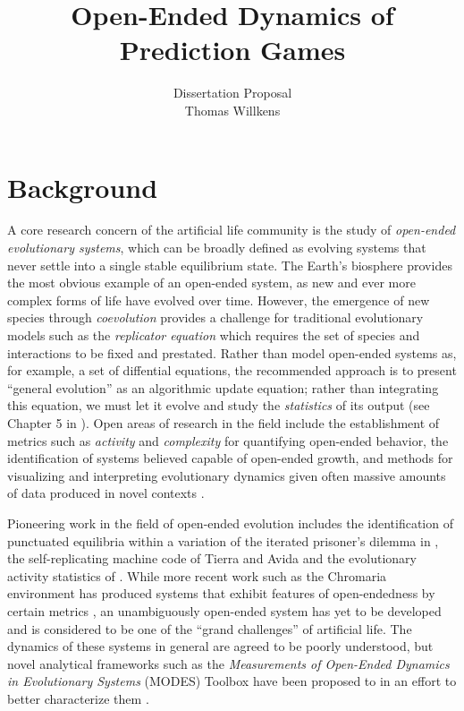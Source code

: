 \documentclass{article}
\title{Open-Ended Dynamics of Prediction Games}
\author{Dissertation Proposal\\
    Thomas Willkens
    }
\date{}
\begin{document}
\maketitle

\section*{Background}
A core research concern of the artificial life community is the study of
\textit{open-ended evolutionary systems}, which can be broadly defined as evolving systems that
never settle into a single stable equilibrium state. The Earth's biosphere provides the most
obvious example of an open-ended system, as new and ever more complex forms of life have evolved over 
time. However, the emergence of new species through \textit{coevolution} 
provides a challenge for traditional evolutionary models
such as the \textit{replicator equation} which requires the set of species and interactions to be 
fixed and prestated. Rather than model open-ended systems as, for example, a set of diffential equations, 
the recommended approach is to present ``general evolution'' as an algorithmic update equation;
rather than integrating this equation, we must let it evolve and study the \textit{statistics}
of its output (see Chapter 5 in \citep{thurner2018}). 
Open areas of research in the field include the establishment of metrics such as 
\textit{activity} and \textit{complexity} for quantifying open-ended behavior, the 
identification of systems believed capable of open-ended growth, and methods for visualizing 
and interpreting evolutionary dynamics given often massive amounts of data produced in novel 
contexts \citep{packard2019,stepney2021modelling,dolson2020}.

Pioneering work in the field of open-ended evolution includes the identification of punctuated 
equilibria within a variation of the
iterated prisoner's dilemma in \citet{lindgren1994evolutionary}, the self-replicating machine 
code of Tierra and Avida \citep{ray1992evolution,ofria2004avida} and the evolutionary activity 
statistics of \citet{Channon2001PassingTA}. While more recent work such as the Chromaria environment has produced  
systems that exhibit features of open-endedness
by certain metrics \citep{adams2017formal,soros2014identifying}, an unambiguously open-ended 
system has yet to be developed and is considered 
to be one of the ``grand challenges'' of artificial life. The dynamics of these systems in 
general are agreed to be poorly understood, but novel analytical frameworks such as the 
\textit{Measurements of Open-Ended Dynamics in Evolutionary Systems} (MODES) Toolbox have been
proposed to in an effort to better characterize them \citep{dolson2019modes}.
\end{document}
